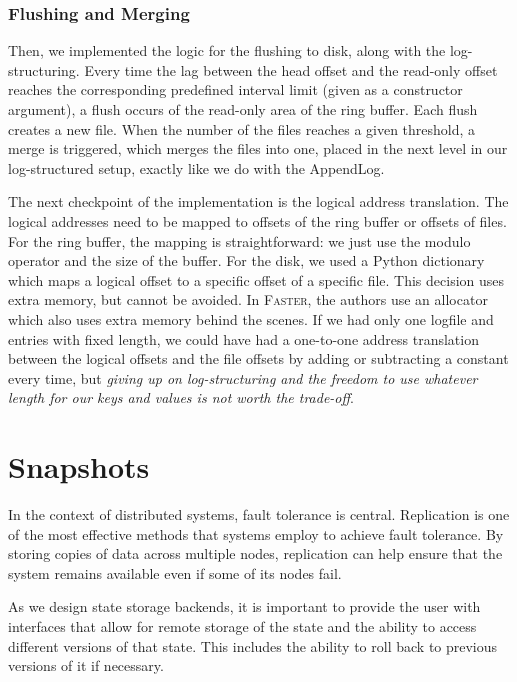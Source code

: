 \subsubsection{Flushing and Merging}

Then, we implemented the logic for the flushing to disk, along with the log-structuring. Every time the lag between the head offset and the read-only offset reaches the corresponding predefined interval limit (given as a constructor argument), a flush occurs of the read-only area of the ring buffer. Each flush creates a new file. When the number of the files reaches a given threshold, a merge is triggered, which merges the files into one, placed in the next level in our log-structured setup, exactly like we do with the AppendLog.

The next checkpoint of the implementation is the logical address translation. The logical addresses need to be mapped to offsets of the ring buffer or offsets of files. For the ring buffer, the mapping is straightforward: we just use the modulo operator and the size of the buffer. For the disk, we used a Python dictionary which maps a logical offset to a specific offset of a specific file. This decision uses extra memory, but cannot be avoided. In \textsc{Faster}, the authors use an allocator which also uses extra memory behind the scenes. If we had only one logfile and entries with fixed length, we could have had a one-to-one address translation between the logical offsets and the file offsets by adding or subtracting a constant every time, but \textit{giving up on log-structuring and the freedom to use whatever length for our keys and values is not worth the trade-off}.


\section{Snapshots}
\label{section-snapshots}

In the context of distributed systems, fault tolerance is central.
Replication is one of the most effective methods that systems employ to achieve fault tolerance. By storing copies of data across multiple nodes, replication can help ensure that the system remains available even if some of its nodes fail.

As we design state storage backends, it is important to provide the user with interfaces that allow for remote storage of the state and the ability to access different versions of that state. This includes the ability to roll back to previous versions of it if necessary.

